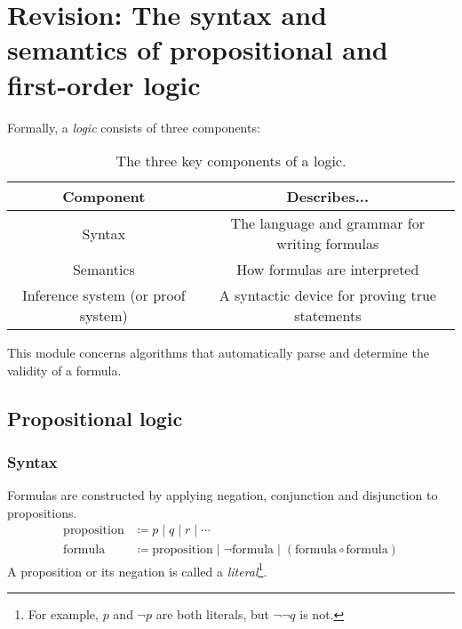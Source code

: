 \section{Revision: The syntax and semantics of propositional and first-order logic}

Formally, a \emph{logic} consists of three components:

\begin{table}[H]
    \centering
    \begin{tabular}{|c|c|}
        \hline
        \textbf{Component} & \textbf{Describes...}\\
        \hline
        Syntax & The language and grammar for writing formulas\\
        \hline
        Semantics & How formulas are interpreted\\
        \hline
        Inference system (or proof system) & A syntactic device for proving true statements\\
        \hline
    \end{tabular}

    \caption{The three key components of a logic.}
    \label{tab:Ch01-components-of-a-logic}
\end{table}

This module concerns algorithms that automatically parse and determine the validity of a formula.


\subsection{Propositional logic}

\subsubsection{Syntax}

Formulas are constructed by applying negation, conjunction and disjunction to propositions. 
%
\begin{align*}
    \text{proposition} &\coloneq p \;\vert\; q \;\vert\; r \;\vert\; \cdots\\
    \text{formula} &\coloneq \text{proposition} \;\vert\; \neg \text{formula} \;\vert\; (\text{formula} \circ \text{formula})  \tag{where \(\circ\) is \(\land\), \(\lor\) or \(\rightarrow\)}
\end{align*}
%
A proposition or its negation is called a \emph{literal}\footnote{For example, \(p\) and \(\neg p\) are both literals, but \(\neg\neg q\) is not.}.

